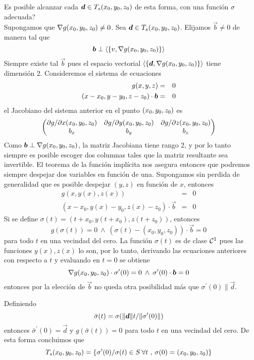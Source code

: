 {\textquestiondown}Es posible alcanzar cada $\vec{d}\in T_s{\p0}$ de esta forma, con una
funci\'on $\sigma$ adecuada? \\ Supongamos que $\nabla g{\p0}\neq
0$. Sea $\vec{d}\in T_s{\p0}$. Elijamos $\vec{b}\neq 0$ de manera tal que
$$\vec{b}\perp \langle\{v,\nabla g{\p0}\}\rangle$$ 
Siempre existe tal $\vec{b}$ pues el espacio vectorial $\langle\{\vec{d},\nabla g{\p0}\}\rangle$
tiene dimensi\'on 2. Consideremos el sistema de ecuaciones
\begin{eqnarray*}
g{(x,y,z)} &= & 0 \\(x-x_0,y-y_0,z-z_0)\cdot \boldsymbol{b} &=& 0
\end{eqnarray*}
el Jacobiano del sistema anterior en el punto $\p0$ es
\[\begin{pmatrix}\dd g/\dd x{\p0} & \dd g/\dd y{\p0} & \dd g/\dd z{\p0}
\cr b_x & b_y & b_z \cr\end{pmatrix}\] 
Como $\vec{b}\perp \nabla g{\p0}$, la matriz
Jacobiana tiene rango 2, y por lo tanto siempre es posible escoger
dos columnas tales que la matriz resultante sea invertible. El
teorema de la funci\'on impl\'icita nos asegura entonces que
podremos siempre despejar dos variables en funci\'on de una.
Supongamos sin perdida de generalidad que es posible despejar
$(y,z)$ en funci\'on de $x$, entonces
\begin{eqnarray*}
g(x,y(x),z(x)) &=&0 \\ (x-x_0,y(x)-y_0,z(x)-z_0)\cdot \vec{b} &=& 0
\end{eqnarray*}
Si se define $\sigma(t)=(t+x_0,y(t+x_0),z(t+z_0))$, entonces
\[g(\sigma(t))=0\: \wedge \: (\sigma(t)-(x_0,y_0,z_0))\cdot
\vec{b}=0\] 
para todo $t$ en una vecindad del cero. La funci\'on
$\sigma(t)$ es de clase ${\cal{C}}^1$ pues las funciones $y(x),z(x)$ lo
son, por lo tanto, derivando las ecuaciones anteriores con
respecto a $t$ y evaluando en $t=0$ se obtiene
\[\nabla g{\p0}\cdot\sigma^{\prime}(0)=0\:\wedge\:
\sigma^{\prime}(0)\cdot \vec{b}=0\] 
entonces por la elecci\'on de $\vec{b}$ no
queda otra posibilidad m\'as que $\sigma^{\prime}(0)\parallel \vec{d}$.

Definiendo $$\bar{\sigma}(t)=\sigma(\lVert\boldsymbol{d}\rVert t/\lVert\sigma^{\prime}(0)\rVert)$$
entonces $\bar{\sigma}^{\prime}(0)=\vec{d}$ y $g(\bar{\sigma}(t))=0$
para todo $t$ en una vecindad del cero. De esta forma concluimos
que
\[T_s{\p0}=\{\sigma^{\prime}(0) / \sigma(t)\in S\: \forall
t \text{ , } \sigma(0)={\p0}\}\]

